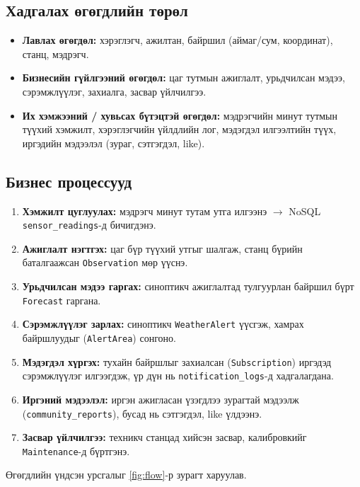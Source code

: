 \documentclass[12pt,a4paper]{article}
\begin{document}
\subsection{Хадгалах өгөгдлийн төрөл}
\begin{itemize}
  \item \textbf{Лавлах өгөгдөл:} хэрэглэгч, ажилтан, байршил (аймаг/сум, координат), станц, мэдрэгч.
  \item \textbf{Бизнесийн гүйлгээний өгөгдөл:} цаг тутмын ажиглалт, урьдчилсан мэдээ, сэрэмжлүүлэг, захиалга, засвар үйлчилгээ.
  \item \textbf{Их хэмжээний / хувьсах бүтэцтэй өгөгдөл:} мэдрэгчийн минут тутмын түүхий хэмжилт, хэрэглэгчийн үйлдлийн лог, мэдэгдэл илгээлтийн түүх, иргэдийн мэдээлэл (зураг, сэтгэгдэл, like).
\end{itemize}

\subsection{Бизнес процессууд}
\begin{enumerate}
  \item \textbf{Хэмжилт цуглуулах:} мэдрэгч минут тутам утга илгээнэ $\rightarrow$ NoSQL \texttt{sensor\_readings}-д бичигдэнэ.
  \item \textbf{Ажиглалт нэгтгэх:} цаг бүр түүхий утгыг шалгаж, станц бүрийн баталгаажсан \texttt{Observation} мөр үүснэ.
  \item \textbf{Урьдчилсан мэдээ гаргах:} синоптикч ажиглалтад тулгуурлан байршил бүрт \texttt{Forecast} гаргана.
  \item \textbf{Сэрэмжлүүлэг зарлах:} синоптикч \texttt{WeatherAlert} үүсгэж, хамрах байршлуудыг (\texttt{AlertArea}) сонгоно.
  \item \textbf{Мэдэгдэл хүргэх:} тухайн байршлыг захиалсан (\texttt{Subscription}) иргэдэд сэрэмжлүүлэг илгээгдэж, үр дүн нь \texttt{notification\_logs}-д хадгалагдана.
  \item \textbf{Иргэний мэдээлэл:} иргэн ажигласан үзэгдлээ зурагтай мэдээлж (\texttt{community\_reports}), бусад нь сэтгэгдэл, like үлдээнэ.
  \item \textbf{Засвар үйлчилгээ:} техникч станцад хийсэн засвар, калибровкийг \texttt{Maintenance}-д бүртгэнэ.
\end{enumerate}

Өгөгдлийн үндсэн урсгалыг \ref{fig:flow}-р зурагт харуулав.
\end{document}
